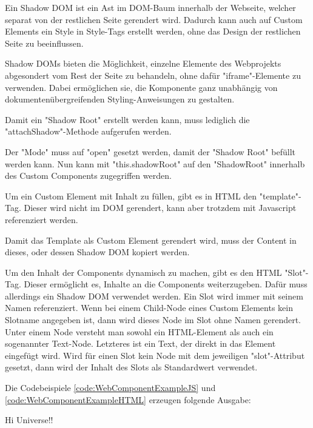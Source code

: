 Ein Shadow DOM ist ein Ast im DOM-Baum innerhalb der Webseite, welcher separat von der restlichen Seite gerendert wird.
Dadurch kann auch auf Custom Elements ein Style in Style-Tags erstellt werden, ohne das Design der restlichen Seite zu beeinflussen. \cite{MDNShadowRoot}

Shadow DOMs bieten die Möglichkeit, einzelne Elemente des Webprojekts abgesondert vom Rest der Seite zu behandeln, ohne dafür "{\ttfamily iframe}"-Elemente zu verwenden. Dabei ermöglichen sie, die Komponente ganz unabhängig von dokumentenübergreifenden Styling-Anweisungen zu gestalten. \cite{IONOSShadowDom}

Damit ein "Shadow Root" erstellt werden kann, muss lediglich die "{\ttfamily attachShadow}"-Methode aufgerufen werden. \cite{MDNShadowRoot}


Der "Mode" muss auf "{\ttfamily open}" gesetzt werden, damit der "Shadow Root" befüllt werden kann. Nun kann mit "{\ttfamily this.shadowRoot}" auf den "ShadowRoot" innerhalb des Custom Components zugegriffen werden.
\cite{MDNShadowRoot}

\pagebreak
{}

Um ein Custom Element mit Inhalt zu füllen, gibt es in HTML den "template"-Tag. Dieser wird nicht im DOM gerendert, kann aber trotzdem mit Javascript referenziert werden. \cite{MDNtemplate}


Damit das Template als Custom Element gerendert wird, muss der Content in dieses, oder dessen Shadow DOM kopiert werden.



Um den Inhalt der Components dynamisch zu machen, gibt es den HTML "Slot"-Tag. 
Dieser ermöglicht es, Inhalte an die Components weiterzugeben. 
Dafür muss allerdings ein Shadow DOM verwendet werden. 
Ein Slot wird immer mit seinem Namen referenziert. 
Wenn bei einem Child-Node eines Custom Elements kein Slotname angegeben ist, dann wird dieses Node im Slot ohne Namen gerendert. 
Unter einem Node versteht man sowohl ein HTML-Element als auch ein sogenannter Text-Node. 
Letzteres ist ein Text, der direkt in das Element eingefügt wird. 
Wird für einen Slot kein Node mit dem jeweiligen "{\ttfamily slot}"-Attribut gesetzt, dann wird der Inhalt des Slots als Standardwert verwendet. 
\cite{MDNSlots}

\pagebreak
{}




Die Codebeispiele \ref{code:WebComponentExampleJS} und \ref{code:WebComponentExampleHTML} erzeugen folgende Ausgabe:

{\ttfamily Hi Universe!!}
